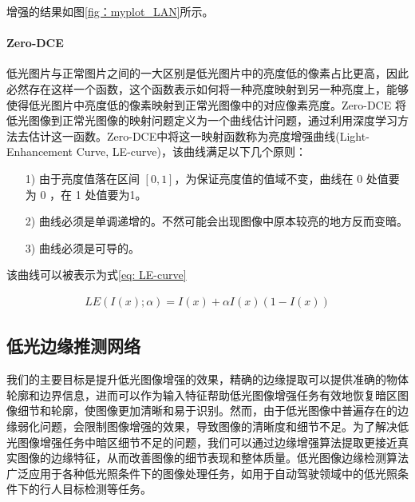 \documentclass[a4paper]{ctexart}
\begin{document}
	增强的结果如图\ref{fig：myplot_LAN}所示。
	
	\paragraph{Zero-DCE} 
	
	低光图片与正常图片之间的一大区别是低光图片中的亮度低的像素占比更高，因此必然存在这样一个函数，这个函数表示如何将一种亮度映射到另一种亮度上，能够使得低光图片中亮度低的像素映射到正常光图像中的对应像素亮度。Zero-DCE 将低光图像到正常光图像的映射问题定义为一个曲线估计问题，通过利用深度学习方法去估计这一函数。Zero-DCE中将这一映射函数称为亮度增强曲线(Light-Enhancement Curve, LE-curve)，该曲线满足以下几个原则：
	
	\begin{itemize}
		\item [1)]
		由于亮度值落在区间 $[0, 1]$，为保证亮度值的值域不变，曲线在 0 处值要为 0 ，在 1 处值要为1。
		
		\item [2)]
		曲线必须是单调递增的。不然可能会出现图像中原本较亮的地方反而变暗。
		
		\item [3)]
		曲线必须是可导的。
		
	\end{itemize}
	
	该曲线可以被表示为式\ref{eq: LE-curve}
	
	\begin{equation}
		\begin{aligned}
			LE(I(x); \alpha) = I(x) + \alpha I(x)(1-I(x))
		\end{aligned}
		\label{eq: LE-curve}
	\end{equation}
	
	\subsection{低光边缘推测网络}
	
	我们的主要目标是提升低光图像增强的效果，精确的边缘提取可以提供准确的物体轮廓和边界信息，进而可以作为输入特征帮助低光图像增强任务有效地恢复暗区图像细节和轮廓，使图像更加清晰和易于识别。然而，由于低光图像中普遍存在的边缘弱化问题，会限制图像增强的效果，导致图像的清晰度和细节不足。为了解决低光图像增强任务中暗区细节不足的问题，我们可以通过边缘增强算法提取更接近真实图像的边缘特征，从而改善图像的细节表现和整体质量。低光图像边缘检测算法广泛应用于各种低光照条件下的图像处理任务，如用于自动驾驶领域中的低光照条件下的行人目标检测等任务。
	
\end{document}
